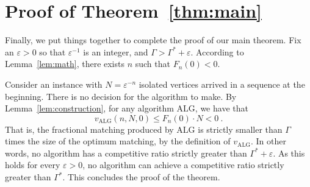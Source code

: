 \documentclass[11pt,letterpaper]{article}
\newcommand{\alg}{\mathrm{ALG}}
\newcommand{\eps}{\varepsilon}
\begin{document}
\section{Proof of Theorem~\ref{thm:main}}
\label{sec:main}
Finally, we put things together to complete the proof of our main theorem. Fix an $\eps>0$ so that $\eps^{-1}$ is an integer, and $\Gamma > \Gamma^*+\eps$. 
According to Lemma~\ref{lem:math}, there exists $n$ such that $F_n(0) <0$. 

Consider an instance with $N = \eps^{-n}$ isolated vertices arrived in a sequence at the beginning. There is no decision for the algorithm to make. 
By Lemma~\ref{lem:construction}, for any algorithm $\alg$, we have that
\[
v_\alg(n,N,0) \le F_n(0) \cdot N < 0~.
\]
That is, the fractional matching produced by $\alg$ is strictly smaller than $\Gamma$ times the size of the optimum matching, by the definition of $v_\alg$. In other words, no algorithm has a competitive ratio strictly greater than $\Gamma^* + \eps$. As this holds for every $\eps>0$, no algorithm can achieve a competitive ratio strictly greater than $\Gamma^*$. This concludes the proof of the theorem. 
\newpage



\end{document}

